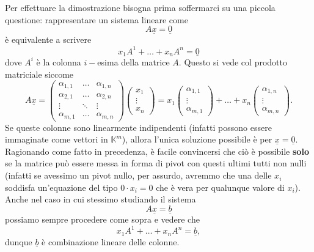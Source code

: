 Per effettuare la dimostrazione bisogna prima soffermarci su una piccola questione: rappresentare un sistema lineare come
$$
  A \underline{x} = \underline{0}
$$
è equivalente a scrivere
$$
  x_1 A^1 + \ldots + x_n A^n = \underline{0}
$$
dove $A^i$ è la colonna $i-$esima della matrice $A$. Questo si vede col prodotto matriciale siccome
$$
  A\underline{x} = \begin{pmatrix}
  \alpha_{1,1} & \ldots & \alpha_{1, n} \\
  \alpha_{2, 1} & \ldots & \alpha_{2, n} \\
  \vdots & \ddots & \vdots \\
  \alpha_{m, 1} & \ldots & \alpha_{m,n}
  \end{pmatrix} \begin{pmatrix}
    x_1 \\
    \vdots \\
    x_n
  \end{pmatrix} = x_1 \begin{pmatrix}
    \alpha_{1, 1} \\
    \vdots \\
    \alpha_{m, 1}
  \end{pmatrix} + \ldots + x_n \begin{pmatrix}
    \alpha_{1, n} \\
    \vdots \\
    \alpha_{m, n}
  \end{pmatrix}.
$$
Se queste colonne sono linearmente indipendenti (infatti possono essere immaginate come vettori in $\mathbb{K}^m$), allora l'unica soluzione possibile è per $\underline{x} = \underline{0}$. Ragionando come fatto in precedenza, è facile convincersi che ciò è possibile \textbf{solo} se la matrice può essere messa in forma di pivot con questi ultimi tutti non nulli (infatti se avessimo un pivot nullo, per assurdo, avremmo che una delle $x_i$ soddisfa un'equazione del tipo $0 \cdot x_i = 0$ che è vera per qualunque valore di $x_i$). Anche nel caso in cui stessimo studiando il sistema
$$
  A \underline{x} = \underline{b}
$$
possiamo sempre procedere come sopra e vedere che
$$
  x_1 A^1 + \ldots + x_n A^n = \underline{b},
$$
dunque $\underline{b}$ è combinazione lineare delle colonne.
